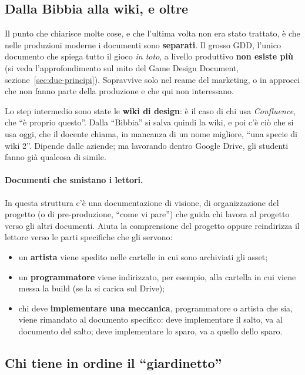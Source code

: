 \subsection{Dalla Bibbia alla wiki, e oltre}

Il punto che chiarisce molte cose, e che l'ultima volta non era stato
trattato, è che nelle produzioni moderne i documenti sono
\textbf{separati}. Il grosso GDD, l'unico documento che spiega tutto il gioco
\emph{in toto}, a livello produttivo \textbf{non esiste più} (si veda
l'approfondimento sul mito del Game Design Document,
sezione~\ref{sec:due-principi}). Sopravvive solo nel reame del marketing, o
in approcci che non fanno parte della produzione e che qui non interessano.

Lo step intermedio sono state le \textbf{wiki di design}: è il caso di chi usa
\emph{Confluence}, che ``è proprio questo''. Dalla ``Bibbia'' si salva quindi
la wiki, e poi c'è ciò che si usa oggi, che il docente chiama, in mancanza di
un nome migliore, ``una specie di wiki 2''. Dipende dalle aziende; ma
lavorando dentro Google Drive, gli studenti fanno già qualcosa di simile.

\paragraph{Documenti che smistano i lettori.} In questa struttura c'è una
documentazione di visione, di organizzazione del progetto (o di
pre-produzione, ``come vi pare'') che guida chi lavora al progetto verso gli
altri documenti. Aiuta la comprensione del progetto oppure reindirizza il
lettore verso le parti specifiche che gli servono:
\begin{itemize}
  \item un \textbf{artista} viene spedito nelle cartelle in cui sono
        archiviati gli asset;
  \item un \textbf{programmatore} viene indirizzato, per esempio, alla
        cartella in cui viene messa la build (se la si carica sul Drive);
  \item chi deve \textbf{implementare una meccanica}, programmatore o artista
        che sia, viene rimandato al documento specifico: deve implementare il
        salto, va al documento del salto; deve implementare lo sparo, va a
        quello dello sparo.
\end{itemize}

\subsection{Chi tiene in ordine il ``giardinetto''}

